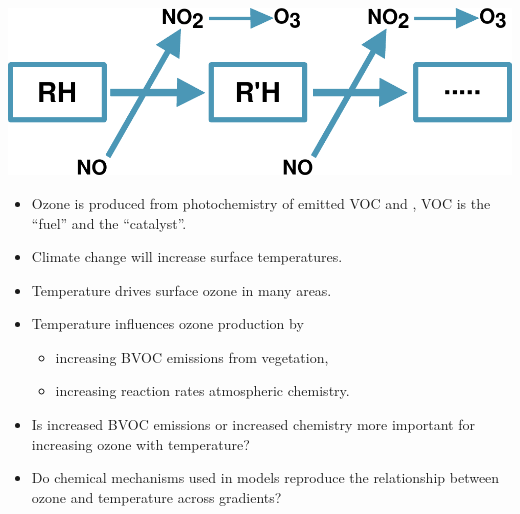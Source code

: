 \begin{BlueBox}
    \vskip-1cm
    \begin{block}{}
        \includegraphics[width=\textwidth]{VOC_Oxidation}
        \begin{itemize}
            \item Ozone is produced from photochemistry of emitted VOC and , VOC is the ``fuel'' and  the ``catalyst''. \vspace{5mm}
            \item Climate change will increase surface temperatures. \vspace{5mm}
            \item Temperature drives surface ozone in many areas. \vspace{5mm}
            \item Temperature influences ozone production by
                \begin{itemize}
                    \item increasing BVOC emissions from vegetation,
                    \item increasing reaction rates atmospheric chemistry.  \vspace{5mm}
                \end{itemize}
            \item Is increased BVOC emissions or increased chemistry more important for increasing ozone with temperature? \vspace{-2mm}
            \item Do chemical mechanisms used in models reproduce the relationship between ozone and temperature across  gradients?
        \end{itemize}
    \end{block}
\end{BlueBox}
